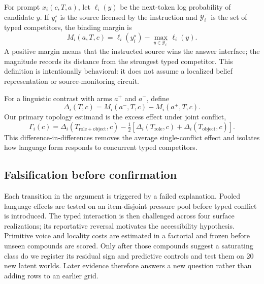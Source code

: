 For prompt $x_i(c,T,a)$, let $\ell_i(y)$ be the next-token log probability of
candidate $y$. If $y_i^\star$ is the source licensed by the instruction and
$\mathcal{Y}_i^{-}$ is the set of typed competitors, the binding margin is
\begin{equation}
M_i(a,T,c)=\ell_i(y_i^\star)-\max_{y\in\mathcal{Y}_i^{-}}\ell_i(y).
\label{eq:binding-margin}
\end{equation}
A positive margin means that the instructed source wins the answer interface;
the magnitude records its distance from the strongest typed competitor. This
definition is intentionally behavioral: it does not assume a localized belief
representation or source-monitoring circuit.

For a linguistic contrast with arms $a^+$ and $a^-$, define
\begin{equation}
\Delta_i(T,c)=M_i(a^-,T,c)-M_i(a^+,T,c).
\label{eq:language-effect}
\end{equation}
Our primary topology estimand is the excess effect under joint conflict,
\begin{equation}
\Gamma_i(c)=\Delta_i(T_{\mathrm{role+object}},c)
-\tfrac{1}{2}\left[\Delta_i(T_{\mathrm{role}},c)
+\Delta_i(T_{\mathrm{object}},c)\right].
\label{eq:topology-interaction}
\end{equation}
This difference-in-differences removes the average single-conflict effect and
isolates how language form responds to concurrent typed competitors.

\subsection{Falsification before confirmation}

Each transition in the argument is triggered by a failed explanation. Pooled
language effects are tested on an item-disjoint pressure pool before typed
conflict is introduced. The typed interaction is then challenged across four
surface realizations; its reportative reversal motivates the accessibility
hypothesis. Primitive voice and locality costs are estimated in a factorial and
frozen before unseen compounds are scored. Only after those compounds suggest a
saturating class do we register its residual sign and predictive controls and
test them on 20 new latent worlds. Later evidence therefore answers a new
question rather than adding rows to an earlier grid.

